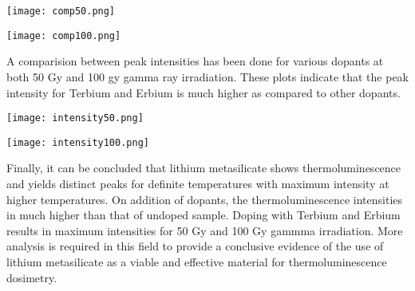 \documentclass[../result.tex]{subfiles}
\begin{document}
    \FloatBarrier\begin{multicols}{2}
        \begin{Figure}
            \centering
            \texttt{[image: comp50.png]}
            \label{fig:comp50}
        \end{Figure}
        \begin{Figure}
            \centering
            \texttt{[image: comp100.png]}
            \label{fig:comp100}
        \end{Figure}
    \end{multicols}

    A comparision between peak intensities has been done for various dopants at both 50 Gy and 100 gy gamma ray 
    irradiation. These plots indicate that the peak intensity for Terbium and Erbium is much higher as compared to 
    other dopants. 

    \FloatBarrier\begin{multicols}{2}
        \begin{Figure}
            \centering
            \texttt{[image: intensity50.png]}
            \label{fig:intensity50}
        \end{Figure}
        \begin{Figure}
            \centering
            \texttt{[image: intensity100.png]}
            \label{fig:intensity100}
        \end{Figure}
    \end{multicols}

    Finally, it can be concluded that lithium metasilicate shows thermoluminescence and yields distinct peaks for definite
    temperatures with maximum intensity at higher temperatures. On addition of dopants, the thermoluminescence intensities in
    much higher than that of undoped sample. Doping with Terbium and Erbium results in maximum intensities for 50 Gy and 100 Gy 
    gammma irradiation. More analysis is required in this field to provide a conclusive evidence of the use of lithium metasilicate
    as a viable and effective material for thermoluminescence dosimetry.
\end{document}
